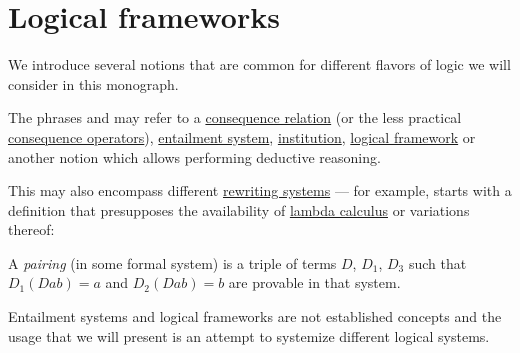 \section{Logical frameworks}\label{sec:logical_frameworks}

We introduce several notions that are common for different flavors of logic we will consider in this monograph.

\begin{concept}\label{con:logical_system}
  The phrases  and  may refer to a \hyperref[def:consequence_relation]{consequence relation} (or the less practical \hyperref[def:consequence_operator]{consequence operators}), \hyperref[def:entailment_system]{entailment system}, \hyperref[def:institution]{institution}, \hyperref[def:logical_framework]{logical framework} or another notion which allows performing deductive reasoning.

  This may also encompass different \hyperref[def:rewriting_system]{rewriting systems} --- for example, \cite{Barendregt1974SurjectivePairing} starts with a definition that presupposes the availability of \hyperref[ch:lambda_calculus]{lambda calculus} or variations thereof:
  \begin{displayquote}
    A \textit{pairing} (in some formal system) is a triple of terms \( D \), \( D_1 \), \( D_3 \) such that \( D_1(Dab) = a \) and \( D_2(Dab) = b \) are provable in that system.
  \end{displayquote}

  Entailment systems and logical frameworks are not established concepts and the usage that we will present is an attempt to systemize different logical systems.
\end{concept}


